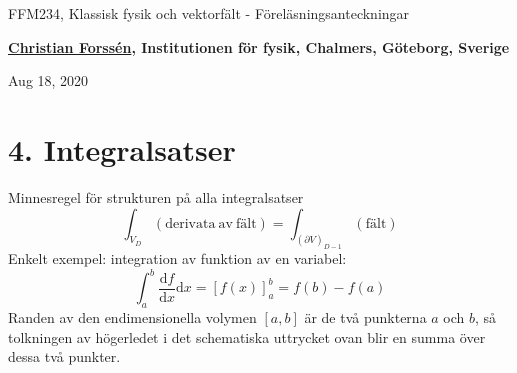 \documentclass[%
oneside,                 %
final,                   %
10pt]{article}
\begin{document}

\newcommand{\exercisesection}[1]{\subsection*{#1}}







\thispagestyle{empty}

\begin{center}
{\LARGE\bf
\begin{spacing}{1.25}
FFM234, Klassisk fysik och vektorfält - Föreläsningsanteckningar
\end{spacing}
}
\end{center}


\begin{center}
{\bf \href{{http://fy.chalmers.se/subatom/tsp/}}{Christian Forssén}, Institutionen för fysik, Chalmers, Göteborg, Sverige${}^{}$} \\ [0mm]
\end{center}

\begin{center}
\end{center}
    

\begin{center}
Aug 18, 2020
\end{center}

\vspace{1cm}


\section*{4. Integralsatser}

Minnesregel för strukturen på alla integralsatser
\begin{equation}
  \int_{V_D} (\mathrm{derivata~av~fält}) = \int_{(\partial V)_{D-1}} (\mathrm{fält})
\end{equation}
Enkelt exempel: integration av funktion av en variabel:
\begin{equation}
\int_a^b \frac{\mbox{d}f}{\mbox{d}x} \mbox{d}x = \left[ f(x) \right]_a^b = f(b)-f(a)
\end{equation}
Randen av den endimensionella volymen $[a,b]$ är de två punkterna $a$ och $b$, så tolkningen av högerledet i det schematiska uttrycket ovan blir en summa över dessa två punkter.
\end{document}
